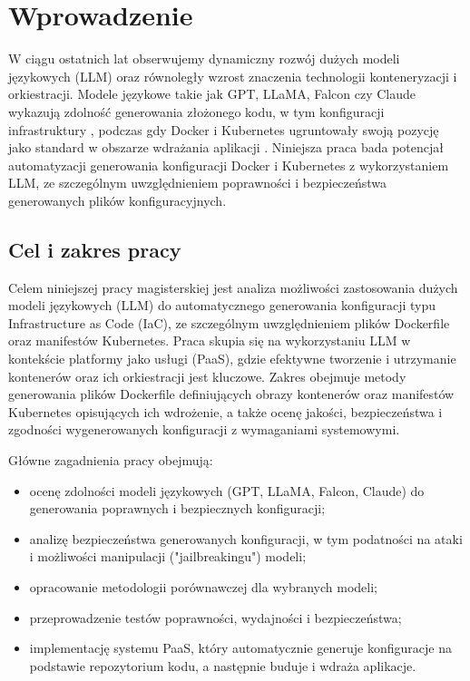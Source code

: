 \clearpage %
\section{Wprowadzenie}

W ciągu ostatnich lat obserwujemy dynamiczny rozwój dużych modeli językowych (LLM) oraz równoległy wzrost znaczenia technologii konteneryzacji i orkiestracji. Modele językowe takie jak GPT, LLaMA, Falcon czy Claude wykazują zdolność generowania złożonego kodu, w tym konfiguracji infrastruktury \cite{srivatsa_survey_2024}, podczas gdy Docker i Kubernetes ugruntowały swoją pozycję jako standard w obszarze wdrażania aplikacji \cite{kratzke_dont_2024}. Niniejsza praca bada potencjał automatyzacji generowania konfiguracji Docker i Kubernetes z wykorzystaniem LLM, ze szczególnym uwzględnieniem poprawności i bezpieczeństwa generowanych plików konfiguracyjnych.

\subsection{Cel i zakres pracy}

Celem niniejszej pracy magisterskiej jest analiza możliwości zastosowania dużych modeli językowych (LLM) do automatycznego generowania konfiguracji typu Infrastructure as Code (IaC), ze szczególnym uwzględnieniem plików Dockerfile oraz manifestów Kubernetes. Praca skupia się na wykorzystaniu LLM w kontekście platformy jako usługi (PaaS), gdzie efektywne tworzenie i utrzymanie kontenerów oraz ich orkiestracji jest kluczowe. Zakres obejmuje metody generowania plików Dockerfile definiujących obrazy kontenerów oraz manifestów Kubernetes opisujących ich wdrożenie, a także ocenę jakości, bezpieczeństwa i zgodności wygenerowanych konfiguracji z wymaganiami systemowymi.

Główne zagadnienia pracy obejmują:
\begin{itemize}
  \item ocenę zdolności modeli językowych (GPT, LLaMA, Falcon, Claude) do generowania poprawnych i bezpiecznych konfiguracji;
  \item analizę bezpieczeństwa generowanych konfiguracji, w tym podatności na ataki i możliwości manipulacji ("jailbreakingu") modeli;
  \item opracowanie metodologii porównawczej dla wybranych modeli;
  \item przeprowadzenie testów poprawności, wydajności i bezpieczeństwa;
  \item implementację systemu PaaS, który automatycznie generuje konfiguracje na podstawie repozytorium kodu, a następnie buduje i wdraża aplikacje.
\end{itemize}


